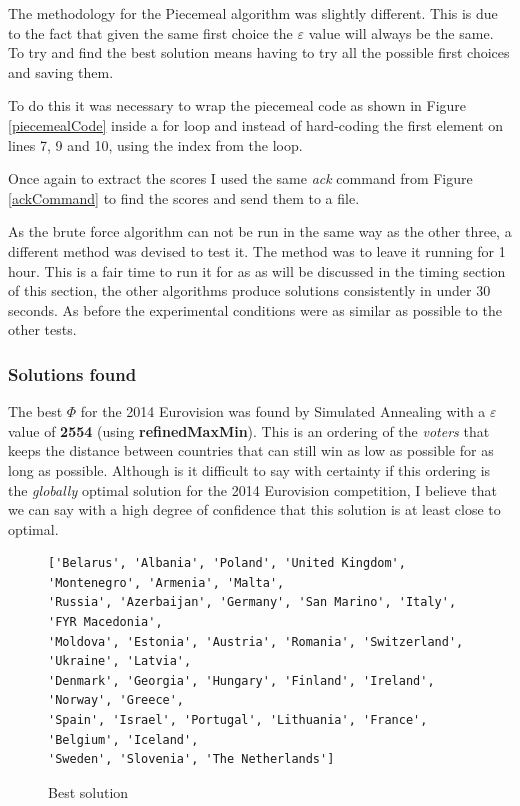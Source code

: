\documentclass[12pt]{report}
\begin{document}

The methodology for the Piecemeal algorithm was slightly different. This is due to the fact that given the same first choice the $\varepsilon$ value will always be the same. To try and find the best solution means having to try all the possible first choices and saving them.

To do this it was necessary to wrap the piecemeal code as shown in Figure \ref{piecemealCode} inside a for loop and instead of hard-coding the first element on lines 7, 9 and 10, using the index from the loop.

Once again to extract the scores I used the same \textit{ack} command from Figure \ref{ackCommand} to find the scores and send them to a file.

As the brute force algorithm can not be run in the same way as the other three, a different method was devised to test it. The method was to leave it running for 1 hour. This is a fair time to run it for as as will be discussed in the timing section of this section, the other algorithms produce solutions consistently in under 30 seconds. As before the experimental conditions were as similar as possible to the other tests.


\subsubsection{Solutions found}
The best $\Phi$ for the 2014 Eurovision was found by Simulated Annealing with a $\varepsilon$ value of \textbf{2554} (using \textbf{refinedMaxMin}). This is an ordering of the \textit{voters} that keeps the distance between countries that can still win as low as possible for as long as possible. Although is it difficult to say with certainty if this ordering is the \textit{globally} optimal solution for the 2014 Eurovision competition, I believe that we can say with a high degree of confidence that this solution is at least close to optimal.

\begin{figure}[H]
\caption{Best solution}
\label{bestSolution}
\begin{verbatim}
['Belarus', 'Albania', 'Poland', 'United Kingdom', 'Montenegro', 'Armenia', 'Malta', 
'Russia', 'Azerbaijan', 'Germany', 'San Marino', 'Italy', 'FYR Macedonia', 
'Moldova', 'Estonia', 'Austria', 'Romania', 'Switzerland', 'Ukraine', 'Latvia', 
'Denmark', 'Georgia', 'Hungary', 'Finland', 'Ireland', 'Norway', 'Greece', 
'Spain', 'Israel', 'Portugal', 'Lithuania', 'France', 'Belgium', 'Iceland', 
'Sweden', 'Slovenia', 'The Netherlands']
\end{verbatim}
\end{figure}
\end{document}
